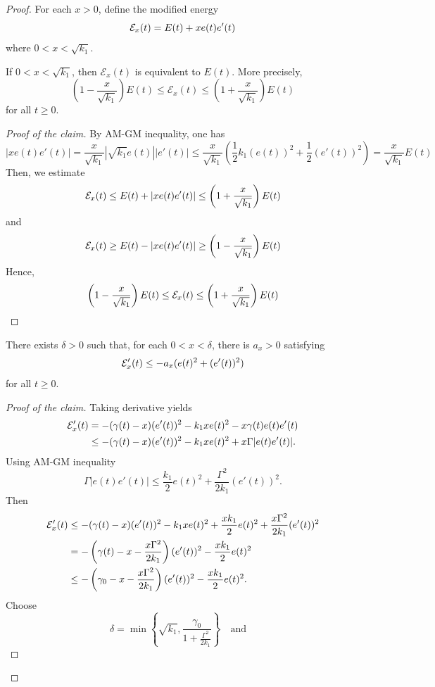 ﻿\documentclass[12pt]{article}
\begin{document}
\begin{proof}
For each $x > 0$, define the modified energy 
\[
\mathcal{E}_x(t) = E(t) + x e(t)e'(t)
\]
where $0 < x < \sqrt{k_1}$.
\begin{claim}\label{4.3}
If $0 < x < \sqrt{k_1}$, then $\mathcal E_x(t)$ is equivalent to $E(t)$. More precisely,
\[
 \left(1 - \frac{x}{\sqrt{k_1}}\right)E(t)
 \le
 \mathcal E_x(t)
 \le
 \left(1 + \frac{x}{\sqrt{k_1}}\right)E(t)
\]
for all $t\ge0$.
\end{claim}
\begin{proof}[Proof of the claim]
By AM-GM inequality, one has 
\[
 |xe(t)e'(t)| = \frac{x}{\sqrt{k_1}}\left|\sqrt{k_1}e(t)\right|\left|e'(t)\right| \leq \frac{x}{\sqrt{k_1}}\left(\frac{1}{2}k_1(e(t))^2 + \frac{1}{2}(e'(t))^2\right) = \frac{x}{\sqrt{k_1}}E(t)
\]
    Then, we estimate 
\[
 \mathcal{E}_x(t) \leq E(t) + |xe(t)e'(t)| \leq \left(1 + \frac{x}{\sqrt{k_1}}\right)E(t)
\]
and 
\[
 \mathcal{E}_x(t) \geq E(t) - |xe(t)e'(t)| \geq \left(1 - \frac{x}{\sqrt{k_1}}\right)E(t)
\]
Hence, 
\[
 \left(1 - \frac{x}{\sqrt{k_1}}\right)E(t) \leq \mathcal{E}_x(t) \leq \left(1 + \frac{x}{\sqrt{k_1}}\right)E(t)
\]
\end{proof}
\begin{claim}\label{4.4}
    There exists $\delta > 0$ such that, for each $0 < x < \delta$, there is $a_x > 0$ satisfying
    \[
 \mathcal{E}'_x(t) \leq - a_x(e(t)^2 + (e'(t))^2)
 \]
    for all $t \geq 0$.
\end{claim}
\begin{proof}[Proof of the claim]
    Taking derivative yields
\begin{align*}
 \mathcal{E}_x'(t)
 & =
 -(\gamma(t) - x)(e'(t))^2
 -k_1x e(t)^2
 -x\gamma(t)e(t)e'(t)\\
 &\le
 -(\gamma(t) - x)(e'(t))^2
 -k_1x e(t)^2
 +x\Gamma |e(t)e'(t)|.
\end{align*}
Using AM-GM inequality
\[
 \Gamma |e(t)e'(t)|
 \le
 \frac{k_1}{2}e(t)^2
 +
 \frac{\Gamma^2}{2k_1}(e'(t))^2.
\]
Then 
\begin{align*}
 \mathcal{E}_x'(t)
 &\le
 -(\gamma(t) - x)(e'(t))^2
 -k_1x e(t)^2
 +
 \frac{xk_1}{2}e(t)^2
 +
 \frac{x\Gamma^2}{2k_1}(e'(t))^2\\
 & =
 -\left(\gamma(t) - x - \frac{x\Gamma^2}{2k_1}\right)(e'(t))^2
 -
 \frac{xk_1}{2}e(t)^2\\
 &\le
 -\left(\gamma_0 - x - \frac{x\Gamma^2}{2k_1}\right)(e'(t))^2
 -
 \frac{xk_1}{2}e(t)^2.
\end{align*}
    Choose
\[
 \delta = \min\left\{\sqrt{k_1},\frac{\gamma_0}{1 + \frac{\Gamma^2}{2k_1}}\right\}\quad \text{and}\quad
\]
\end{proof}
\end{proof}
\end{document}
